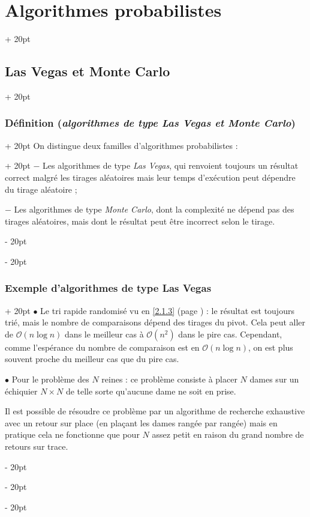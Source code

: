 \documentclass[a4paper, 12pt, twoside]{article}
\newcommand{\ind}[1][20pt]{\advance\leftskip + #1}
\newcommand{\deind}[1][20pt]{\advance\leftskip - #1}
\newenvironment{indt}[2][20pt]{#2 \par \ind[#1]}{\par \deind} %
\newcommand{\1}{\mathbbm 1}
\begin{document}
\begin{indt}{\section{Algorithmes probabilistes}}
        \begin{indt}{\subsection{Las Vegas et Monte Carlo}}
            \begin{indt}{\subsubsection{Définition (\textit{algorithmes de type Las Vegas et Monte Carlo})}}
                \begin{indt}{On distingue deux familles d'algorithmes probabilistes :}
                    $-$ Les algorithmes de type \emph{Las Vegas}, qui renvoient toujours un résultat correct malgré les tirages aléatoires mais leur temps d'exécution peut dépendre du tirage aléatoire ;

                    $-$ Les algorithmes de type \emph{Monte Carlo}, dont la complexité ne dépend pas des tirages aléatoires, mais dont le résultat peut être incorrect selon le tirage.
                \end{indt}
            \end{indt}

            \vspace{12pt}
            
            \begin{indt}{\subsubsection{Exemple d'algorithmes de type Las Vegas}}
                $\bullet$ Le tri rapide randomisé vu en \ref{2.1.3} (page \pageref{2.1.3}) : le résultat est toujours trié, mais le nombre de comparaisons dépend des tirages du pivot.
                Cela peut aller de $\mathcal O(n\log n)$ dans le meilleur cas à $\mathcal O(n^2)$ dans le pire cas.
                Cependant, comme l'espérance du nombre de comparaison est en $\mathcal O(n\log n)$, on est plus souvent proche du meilleur cas que du pire cas.

                \vspace{12pt}
                
                $\bullet$ Pour le problème des $N$ reines : ce problème consiste à placer $N$ dames sur un échiquier $N \times N$ de telle sorte qu'aucune dame ne soit en prise.

                Il est possible de résoudre ce problème par un algorithme de recherche exhaustive avec un retour sur place (en plaçant les dames rangée par rangée) mais en pratique cela ne fonctionne que pour $N$ assez petit en raison du grand nombre de retours sur trace.


\end{indt}
\end{indt}
\end{indt}
\end{document}
